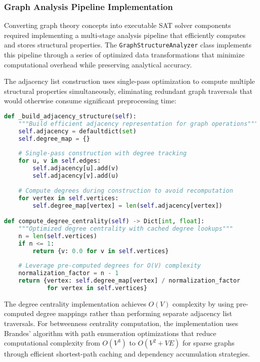 \subsubsection{Graph Analysis Pipeline Implementation}

Converting graph theory concepts into executable SAT solver components required implementing a multi-stage analysis pipeline that efficiently computes and stores structural properties. The \texttt{GraphStructureAnalyzer} class implements this pipeline through a series of optimized data transformations that minimize computational overhead while preserving analytical accuracy.

The adjacency list construction uses single-pass optimization to compute multiple structural properties simultaneously, eliminating redundant graph traversals that would otherwise consume significant preprocessing time:

\begin{lstlisting}[language=Python, caption=Optimized Graph Structure Construction]
def _build_adjacency_structure(self):
    """Build efficient adjacency representation for graph operations"""
    self.adjacency = defaultdict(set)
    self.degree_map = {}
    
    # Single-pass construction with degree tracking
    for u, v in self.edges:
        self.adjacency[u].add(v)
        self.adjacency[v].add(u)
        
    # Compute degrees during construction to avoid recomputation
    for vertex in self.vertices:
        self.degree_map[vertex] = len(self.adjacency[vertex])

def compute_degree_centrality(self) -> Dict[int, float]:
    """Optimized degree centrality with cached degree lookups"""
    n = len(self.vertices)
    if n <= 1:
        return {v: 0.0 for v in self.vertices}
    
    # Leverage pre-computed degrees for O(V) complexity
    normalization_factor = n - 1
    return {vertex: self.degree_map[vertex] / normalization_factor 
            for vertex in self.vertices}
\end{lstlisting}

The degree centrality implementation achieves $O(V)$ complexity by using pre-computed degree mappings rather than performing separate adjacency list traversals. For betweenness centrality computation, the implementation uses Brandes' algorithm with path enumeration optimizations that reduce computational complexity from $O(V^3)$ to $O(V^2 + VE)$ for sparse graphs through efficient shortest-path caching and dependency accumulation strategies.

